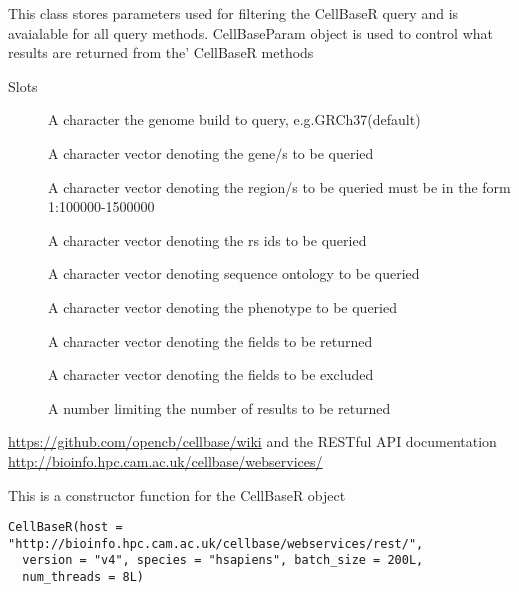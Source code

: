 \documentclass[letterpaper]{book}
\begin{document}
%
\begin{Details}\relax
This class stores parameters used for filtering the CellBaseR query
and is avaialable for all query methods. CellBaseParam object is used to
control what results are returned from the' CellBaseR methods
\end{Details}
%
\begin{Section}{Slots}

\begin{description}

\item[] A character the genome build to query, e.g.GRCh37(default)

\item[] A character vector denoting the gene/s to be queried

\item[] A character vector denoting the region/s to be queried must be 
in the form 1:100000-1500000

\item[] A character vector denoting the rs ids to be queried

\item[] A character vector denoting sequence ontology to be queried

\item[] A character vector denoting the phenotype to be queried

\item[] A character vector denoting the fields to be returned

\item[] A character vector denoting the fields to be excluded

\item[] A number limiting the number of results to be returned

\end{description}
\end{Section}
%
\begin{SeeAlso}\relax
\url{https://github.com/opencb/cellbase/wiki} 
and the RESTful API documentation 
\url{http://bioinfo.hpc.cam.ac.uk/cellbase/webservices/}
\end{SeeAlso}
%
\begin{Description}\relax
This is a constructor function for the CellBaseR object
\end{Description}
%
\begin{Usage}
\begin{verbatim}
CellBaseR(host = "http://bioinfo.hpc.cam.ac.uk/cellbase/webservices/rest/",
  version = "v4", species = "hsapiens", batch_size = 200L,
  num_threads = 8L)
\end{verbatim}
\end{Usage}
\end{document}
